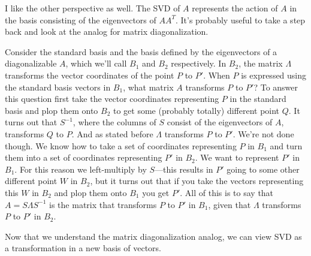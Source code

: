 \documentclass{article}
\begin{document}
I like the other perspective as well. The SVD of $A$ represents the action of $A$ in the basis consisting
of the eigenvectors of $AA^T$. It's probably useful to take a step back and look at the analog for 
matrix diagonalization.

\begin{tcolorbox}[colback=gray!5!white,colframe=gray!75!black,title=Matrix Diagonalization Analog]
  Consider the standard basis and the basis defined by the eigenvectors of a diagonalizable $A$, which
  we'll call $B_1$ and $B_2$ respectively. In $B_2$, the matrix $\Lambda$ transforms the vector coordinates
  of the point $P$ to $P'$. When $P$ is expressed using the standard basis vectors in $B_1$, what matrix $A$ transforms
  $P$ to $P'$?
  \medskip
  \newline
  To answer this question first take the vector coordinates representing $P$ in the standard basis and plop
  them onto $B_2$ to get some (probably totally) different point $Q$. It turns out that $S^{-1}$, where
  the columns of $S$ consist of the eigenvectors of $A$, transforms $Q$ to $P$. And as stated before
  $\Lambda$ transforms $P$ to $P'$.
  \medskip
  \newline
  We're not done though. We know how to take a set of coordinates representing $P$ in $B_1$ and turn 
  them into a set of coordinates representing $P'$ in $B_2$. We want to represent $P'$ in $B_1$. For
  this reason we left-multiply by $S$---this results in $P'$ going to some other different point $W$ 
  in $B_2$, but it turns out that if you take the vectors representing this $W$ in $B_2$ and plop
  them onto $B_1$ you get $P'$. 
  \medskip
  \newline
  All of this is to say that $A = S \Lambda S^{-1}$ is the matrix that transforms $P$ to $P'$ in $B_1$,
  given that $\Lambda$ transforms $P$ to $P'$ in $B_2$.
\end{tcolorbox}

Now that we understand the matrix diagonalization analog, we can view SVD as a transformation in a new 
basis of vectors.
\end{document}
